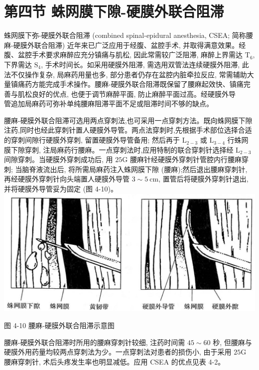 \documentclass[10pt]{article}
\begin{document}
\section*{第四节 蛛网膜下隙-硬膜外联合阻滞}
蛛网膜下弥-硬膜外联合阻滞 (combined spinal-epidural anesthesia, CSEA; 简称腰麻-硬膜外联合阻滞) 近年来已广泛应用于经腹、盆腔手术, 并取得满意效果。经腹、盆腔手术要求麻醉应充分镇痛与肌松, 因此常需较广泛阻滞, 麻醉上界需达 $\mathrm{T}_{6}$, 下界需达 $\mathrm{S}_{4}$, 手术时间长。如采用硬膜外阻滞, 需选用双管法连续硬膜外阻滞, 此法不仅操作复杂, 局麻药用量也多, 部分患者仍存在盆腔内脏牵拉反应, 常需辅助大量镇痛药方能完成手术操作。腰麻-硬膜外联合阻滞既保留了腰麻起效快、镇痛完善与肌松良好的优点, 也便于调节麻醉平面, 防止麻醉平面过高。经硬膜外导\\
管追加局麻药可弥补单纯腰麻阻滞平面不足或阻滞时间不够的缺点。

腰麻-硬膜外联合阻滞可选用两点穿刺法,也可采用一点穿刺方法。既向蛛网膜下隙注药,同时也经此穿刺针置人硬膜外导管。两点法穿刺时,先根据手术部位选择合适的穿刺间隙行硬膜外穿刺, 留置硬膜外导管备用; 然后再于 $\mathrm{L}_{2-3}$ 或 $\mathrm{L}_{3-4}$ 行蛛网膜下隙穿刺, 注局麻药行腰麻。一点穿刺法时,应用特制的联合穿刺针选择经 $\mathrm{L}_{2-3}$ 间隙穿刺。当硬膜外穿刺成功后, 用 $25 \mathrm{G}$ 腰麻针经硬膜外穿刺针管腔内行腰麻穿刺; 当脑脊液流出后, 将所需局麻药注入蛛网膜下隙 (腰麻);然后退出腰麻穿刺针, 再经硬膜外穿刺针向头端置人硬膜外导管 $3 \sim 5 \mathrm{~cm}$, 置管后将硬膜外穿刺针退出,并将硬膜外导管妥为固定 (图 4-10)。\\
\includegraphics[max width=\textwidth, center]{2024_07_09_002a177993bd97d1d6d7g-070}

图 4-10 腰麻-硬膜外联合阻滞示意图

腰麻-硬膜外联合阻滞时所用的腰麻穿刺针较细, 注药时间需 $45 \sim 60$ 秒, 但腰麻与硬膜外用药量均较两点穿刺法为少。一点穿刺法对患者的损伤小, 由于采用 $25 \mathrm{G}$ 腰麻穿刺针, 术后头疼发生率也明显减低。应用 CSEA 的优点见表 4-2。
\end{document}
